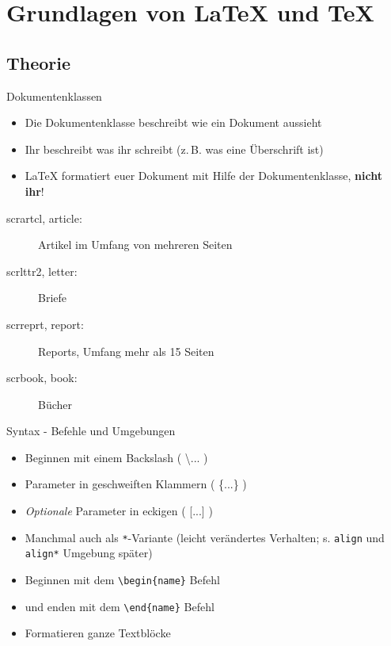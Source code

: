 \documentclass{beamer}
\begin{document}
		
		\section{Grundlagen von \LaTeX{} und \TeX}
		\subsection{Theorie}
		
		\begin{frame}{Dokumentenklassen}
			\begin{itemize}
				\item Die Dokumentenklasse beschreibt wie ein Dokument aussieht
				\item Ihr beschreibt was ihr schreibt (z.\,B. was eine Überschrift ist)
				\item \LaTeX{} formatiert euer Dokument mit Hilfe der Dokumentenklasse, \textbf{nicht ihr}!
			\end{itemize}
			\vspace{0.1cm}
			\begin{description}
				\item[scrartcl, article:] Artikel im Umfang von mehreren Seiten
				\item[scrlttr2, letter:] Briefe
				\item[scrreprt, report:] Reports, Umfang mehr als 15 Seiten
				\item[scrbook, book:] Bücher
			\end{description}
		\end{frame}
		
		
		\begin{frame}{Syntax - Befehle und Umgebungen}
			\begin{itemize}
				\item Beginnen mit einem Backslash ( \textbackslash... )
				\item Parameter in geschweiften Klammern ( \{...\} )
				\item \textit{Optionale} Parameter in eckigen ( [...] )
				\item Manchmal auch als \texttt{*}-Variante (leicht verändertes Verhalten; s. \texttt{align} und \texttt{align*} Umgebung später)
			\end{itemize}
			\begin{itemize}
				\item Beginnen mit dem \texttt{\textbackslash begin\{name\}} Befehl
				\item und enden mit dem \texttt{\textbackslash end\{name\}} Befehl
				\item Formatieren ganze Textblöcke
			\end{itemize}
		\end{frame}
		
\end{document}

